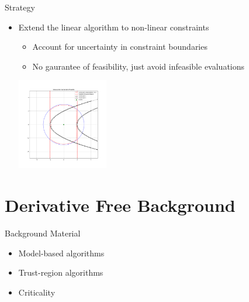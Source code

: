 \documentclass{beamer}
\begin{document}
\begin{frame}{Strategy}
	\begin{itemize}
		\item Extend the linear algorithm to non-linear constraints
		\begin{itemize}
			\item Account for uncertainty in constraint boundaries
			\item No gaurantee of feasibility, just avoid infeasible evaluations
		\end{itemize}
		\begin{center}
			\includegraphics[width=150px]{images/modeled_constraints.png}
		\end{center}
	\end{itemize}
\end{frame}




\section{Derivative Free Background}


\begin{frame}{Background Material}
	\begin{itemize}
		\setlength\itemsep{2em}
		\item Model-based algorithms
		\item Trust-region algorithms
		\item Criticality
	\end{itemize}
\end{frame}
\end{document}
